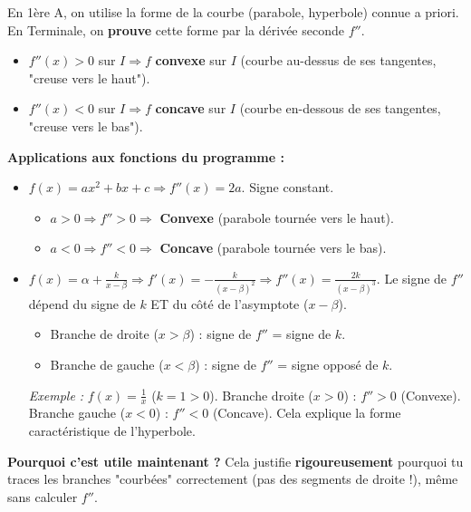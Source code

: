 \documentclass[11pt]{article}
\begin{document}
\begin{savaistu}
En 1ère A, on utilise la forme de la courbe (parabole, hyperbole) connue a priori. En Terminale, on \textbf{prouve} cette forme par la dérivée seconde $f''$.
\begin{itemize}
    \item $f''(x) > 0$ sur $I \Rightarrow f$ \textbf{convexe} sur $I$ (courbe au-dessus de ses tangentes, "creuse vers le haut").
    \item $f''(x) < 0$ sur $I \Rightarrow f$ \textbf{concave} sur $I$ (courbe en-dessous de ses tangentes, "creuse vers le bas").
\end{itemize}
\textbf{Applications aux fonctions du programme :}
\begin{itemize}
    \item $f(x) = ax^2 + bx + c \Rightarrow f''(x) = 2a$. Signe constant.
    \begin{itemize}
        \item $a > 0 \Rightarrow f'' > 0 \Rightarrow$ \textbf{Convexe} (parabole tournée vers le haut).
        \item $a < 0 \Rightarrow f'' < 0 \Rightarrow$ \textbf{Concave} (parabole tournée vers le bas).
    \end{itemize}
    \item $f(x) = \alpha + \frac{k}{x-\beta} \Rightarrow f'(x) = -\frac{k}{(x-\beta)^2} \Rightarrow f''(x) = \frac{2k}{(x-\beta)^3}$.
    Le signe de $f''$ dépend du signe de $k$ ET du côté de l'asymptote ($x-\beta$).
    \begin{itemize}
        \item Branche de droite ($x > \beta$) : signe de $f''$ = signe de $k$.
        \item Branche de gauche ($x < \beta$) : signe de $f''$ = signe opposé de $k$.
    \end{itemize}
    \emph{Exemple :} $f(x) = \frac{1}{x}$ ($k=1>0$). Branche droite ($x>0$) : $f''>0$ (Convexe). Branche gauche ($x<0$) : $f''<0$ (Concave). Cela explique la forme caractéristique de l'hyperbole.
\end{itemize}
\textbf{Pourquoi c'est utile maintenant ?} Cela justifie \textbf{rigoureusement} pourquoi tu traces les branches "courbées" correctement (pas des segments de droite !), même sans calculer $f''$.
\end{savaistu}
\end{document}
